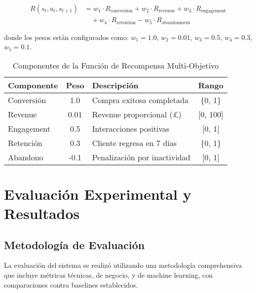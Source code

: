 \begin{align}
R(s_t, a_t, s_{t+1}) &= w_1 \cdot R_{\text{conversion}} + w_2 \cdot R_{\text{revenue}} + w_3 \cdot R_{\text{engagement}} \\
&\quad + w_4 \cdot R_{\text{retention}} - w_5 \cdot R_{\text{abandonment}}
\end{align}

donde los pesos están configurados como: $w_1 = 1.0$, $w_2 = 0.01$, $w_3 = 0.5$, $w_4 = 0.3$, $w_5 = 0.1$.

\vspace{0.3cm}

\begin{table}[H]
\centering
\caption{Componentes de la Función de Recompensa Multi-Objetivo}
\label{tab:reward_components}
\renewcommand{\arraystretch}{1.3}
\begin{tabular}{@{}l|c|p{4cm}|c@{}}
\toprule
\textbf{Componente} & \textbf{Peso} & \textbf{Descripción} & \textbf{Rango} \\
\midrule
Conversión & 1.0 & Compra exitosa completada & \{0, 1\} \\
Revenue & 0.01 & Revenue proporcional (£) & [0, 100] \\
Engagement & 0.5 & Interacciones positivas & [0, 1] \\
Retención & 0.3 & Cliente regresa en 7 días & \{0, 1\} \\
Abandono & -0.1 & Penalización por inactividad & [0, 1] \\
\bottomrule
\end{tabular}
\end{table}

\section{Evaluación Experimental y Resultados}
\label{sec:evaluacion}

\subsection{Metodología de Evaluación}
\label{subsec:metodologia}

La evaluación del sistema se realizó utilizando una metodología comprehensiva que incluye métricas técnicas, de negocio, y de machine learning, con comparaciones contra baselines establecidos.

